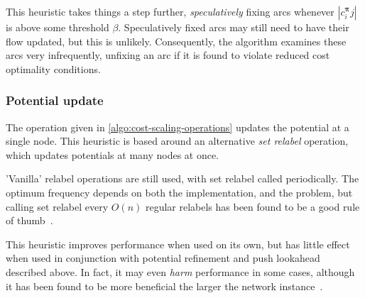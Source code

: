 This heuristic takes things a step further, \emph{speculatively} fixing arcs whenever $\left|c^{\boldsymbol{\pi}}_ij\right|$ is above some threshold $\beta$. Speculatively fixed arcs may still need to have their flow updated, but this is unlikely. Consequently, the algorithm examines these arcs very infrequently, unfixing an arc if it is found to violate reduced cost optimality conditions.

\subsubsection{Potential update}
The  operation given in \cref{algo:cost-scaling-operations} updates the potential at a single node. This heuristic is based around an alternative \emph{set relabel} operation, which updates potentials at many nodes at once.

'Vanilla' relabel operations are still used, with set relabel called periodically. The optimum frequency depends on both the implementation, and the problem, but calling set relabel every $O(n)$ regular relabels has been found to be a good rule of thumb~\cite{Goldberg:1997}.

This heuristic improves performance when used on its own, but has little effect when used in conjunction with potential refinement and push lookahead described above. In fact, it may even \emph{harm} performance in some cases, although it has been found to be more beneficial the larger the network instance~\cite{Bunnagel:1998}.
